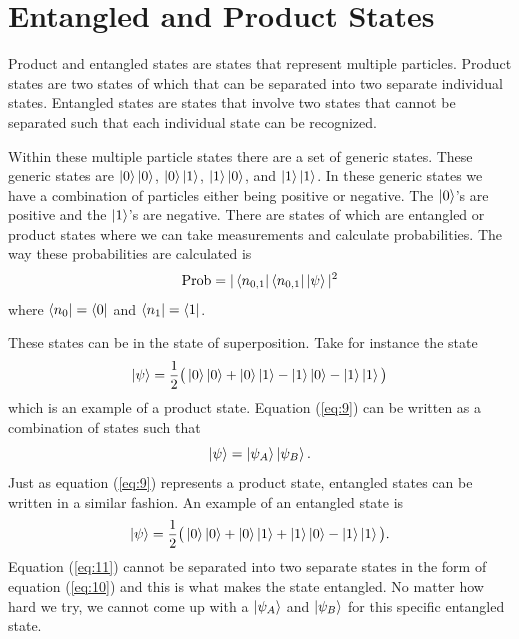 \documentclass[twocolumn]{article}
\begin{document}
\section*{Entangled and Product States}
Product and entangled states are states that represent multiple particles. Product states are two states of which that can be separated into two separate individual states. Entangled states are states that involve two states that cannot be separated such that each individual state can be recognized.

Within these multiple particle states there are a set of generic states. These generic states are $\ket{0}\ket{0}$, $\ket{0}\ket{1}$, $\ket{1}\ket{0}$, and $\ket{1}\ket{1}$. In these generic states we have a combination of particles either being positive or negative. The $\ket{0}$'s are positive and the $\ket{1}$'s are negative. There are states of which are entangled or product states where we can take measurements and calculate probabilities. The way these probabilities are calculated is
\begin{equation}\label{eq:8}
\text{Prob}=|\bra{n_{0,1}}\bra{n_{0,1}}\ket{\psi}|^2
\end{equation}
where $\bra{n_0}=\bra{0}$ and $\bra{n_1}=\bra{1}$. 

These states can be in the state of superposition. Take for instance the state
\begin{equation}\label{eq:9}
\ket{\psi}=\frac{1}{2}\big(\ket{0}\ket{0}+\ket{0}\ket{1}-\ket{1}\ket{0}-\ket{1}\ket{1}\big)
\end{equation}
which is an example of a product state. Equation (\ref{eq:9}) can be written as a combination of states such that
\begin{equation}\label{eq:10}
\ket{\psi}=\ket{\psi_A}\ket{\psi_B}.
\end{equation}
Just as equation (\ref{eq:9}) represents a product state, entangled states can be written in a similar fashion. An example of an entangled state is
\begin{equation}\label{eq:11}
\ket{\psi}=\frac{1}{2}\big(\ket{0}\ket{0}+\ket{0}\ket{1}+\ket{1}\ket{0}-\ket{1}\ket{1}\big).
\end{equation}
Equation (\ref{eq:11}) cannot be separated into two separate states in the form of equation (\ref{eq:10}) and this is what makes the state entangled. No matter how hard we try, we cannot come up with a $\ket{\psi_A}$ and $\ket{\psi_B}$ for this specific entangled state.
\end{document}
